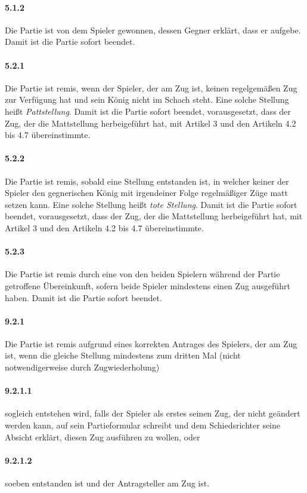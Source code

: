 \documentclass[
  a4paper,
  justified,
  nobib,
]{tufte-handout}
\begin{document}
\paragraph{5.1.2} Die Partie ist von dem Spieler gewonnen, dessen Gegner erklärt, dass er
aufgebe. Damit ist die Partie sofort beendet.
\paragraph{5.2.1} Die Partie ist remis, wenn der Spieler, der am Zug ist, keinen
regelgemäßen Zug zur Verfügung hat und sein König nicht im Schach steht. Eine solche
Stellung heißt \emph{Pattstellung}. Damit ist die Partie sofort beendet, vorausgesetzt,
dass der Zug, der die Mattstellung herbeigeführt hat, mit Artikel 3 und den Artikeln 4.2
bis 4.7 übereinstimmte.
\paragraph{5.2.2} Die Partie ist remis, sobald eine Stellung entstanden ist, in welcher
keiner der Spieler den gegnerischen König mit irgendeiner Folge regelmäßiger Züge matt
setzen kann. Eine solche Stellung heißt \emph{tote Stellung}.
Damit ist die Partie sofort beendet, vorausgesetzt, dass der Zug, der die Mattstellung
herbeigeführt hat, mit Artikel 3 und den Artikeln 4.2 bis 4.7 übereinstimmte.
\paragraph{5.2.3} Die Partie ist remis durch eine von den beiden Spielern während der
Partie getroffene Übereinkunft, sofern beide Spieler mindestens einen Zug ausgeführt
haben. Damit ist die Partie sofort beendet.
\paragraph{9.2.1} Die Partie ist remis aufgrund eines korrekten Antrages des Spielers, der
am Zug ist, wenn die gleiche Stellung mindestens zum dritten Mal (nicht notwendigerweise
durch Zugwiederholung)
\paragraph{9.2.1.1} sogleich entstehen wird, falls der Spieler als erstes seinen Zug, der
nicht geändert werden kann, auf sein Partieformular schreibt und dem Schiedsrichter seine
Absicht erklärt, diesen Zug ausführen zu wollen, oder
\paragraph{9.2.1.2} soeben entstanden ist und der Antragsteller am Zug ist.
\end{document}
